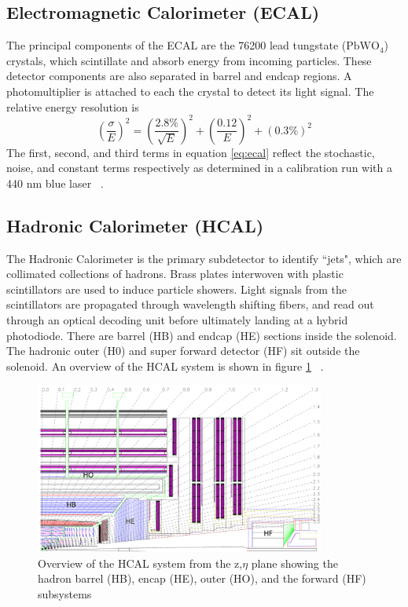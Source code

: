 \subsection{Electromagnetic Calorimeter (ECAL)}

The principal components of the ECAL are the 76200 lead tungstate ($\text{PbWO}_4$) crystals, which scintillate and absorb energy from incoming particles. 
These detector components are also separated in barrel and endcap regions. A photomultiplier is attached to each the crystal to detect its light signal. The relative energy resolution is 
\begin{equation*}
\label{eq:ecal}
\left(\frac{\sigma}{E}\right)^2 = \left( \frac{2.8\%}{\sqrt{E}}  \right)^2 + \left( \frac{0.12}{E}  \right)^2 + (0.3\%)^2 
\end{equation*}
 The first, second, and third terms in equation \ref{eq:ecal} reflect the stochastic, noise, and constant terms respectively as determined in a calibration run with a 440 nm blue laser ~\cite{Chatrchyan:2008zzk,Eichhorn:2112017}. 

\subsection{Hadronic Calorimeter (HCAL)} 
The Hadronic Calorimeter is the primary subdetector to identify ``jets", which are collimated collections of hadrons. 
Brass plates interwoven with plastic scintillators are used to induce particle showers. 
Light signals from the scintillators are propagated through wavelength shifting fibers, and read out through an optical decoding unit before ultimately landing at a hybrid photodiode. 
There are barrel (HB) and endcap (HE) sections inside the solenoid. The hadronic outer (H0) and super forward detector (HF) sit outside the solenoid. An overview of the HCAL system is shown in figure \ref{fig:hcal} ~\cite{Chatrchyan:2008zzk,Eichhorn:2112017}. 

\begin{figure}[ht!b]
  \centering
\includegraphics[width=0.85\textwidth]{figures/HCAL.png}    
    \caption{\label{fig:hcal} Overview of the HCAL system from the z,$\eta$ plane showing the hadron barrel (HB), encap (HE), outer (HO), and the forward (HF) subsystems ~\cite{Chatrchyan:2008zzk}}
\end{figure}




